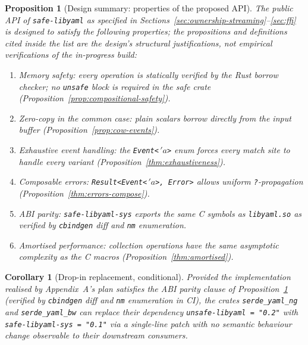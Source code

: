 \documentclass[12pt]{article}
\newtheorem{proposition}[theorem]{Proposition}
\newtheorem{corollary}[theorem]{Corollary}
\theoremstyle{definition}
\theoremstyle{remark}
\newcommand{\lifetime}[1]{\ensuremath{\,'\!#1}}
\begin{document}
\begin{proposition}[Design summary: properties of the proposed API]
\label{thm:safe-libyaml-api}
The public API of \texttt{safe-libyaml} as specified in
Sections~\ref{sec:ownership-streaming}--\ref{sec:ffi} is \emph{designed}
to satisfy the following properties; the propositions and definitions cited
inside the list are the design's structural justifications, not empirical
verifications of the in-progress build:
\begin{enumerate}[leftmargin=2em]
\item \emph{Memory safety}: every operation is statically verified by the Rust
borrow checker; no \texttt{unsafe} block is required in the safe crate
(Proposition~\ref{prop:compositional-safety}).
\item \emph{Zero-copy in the common case}: plain scalars borrow directly from
the input buffer (Proposition~\ref{prop:cow-events}).
\item \emph{Exhaustive event handling}: the \texttt{Event<\lifetime{a}>} enum
forces every match site to handle every variant
(Proposition~\ref{thm:exhaustiveness}).
\item \emph{Composable errors}: \texttt{Result<Event<\lifetime{a}>, Error>}
allows uniform \texttt{?}-propagation (Proposition~\ref{thm:errors-compose}).
\item \emph{ABI parity}: \texttt{safe-libyaml-sys} exports the same C symbols
as \texttt{libyaml.so} as verified by \texttt{cbindgen} diff and
\texttt{nm} enumeration.
\item \emph{Amortised performance}: collection operations have the same
asymptotic complexity as the C macros (Proposition~\ref{thm:amortised}).
\end{enumerate}
\end{proposition}

\begin{corollary}[Drop-in replacement, conditional]
\emph{Provided} the implementation realised by Appendix~A's plan satisfies
the \emph{ABI parity} clause of Proposition~\ref{thm:safe-libyaml-api}
(verified by \texttt{cbindgen} diff and \texttt{nm} enumeration in CI),
the crates \texttt{serde\_yaml\_ng} and \texttt{serde\_yaml\_bw} can
replace their dependency \texttt{unsafe-libyaml = "0.2"} with
\texttt{safe-libyaml-sys = "0.1"} via a single-line patch with no
semantic behaviour change observable to their downstream consumers.
\end{corollary}

\end{document}
